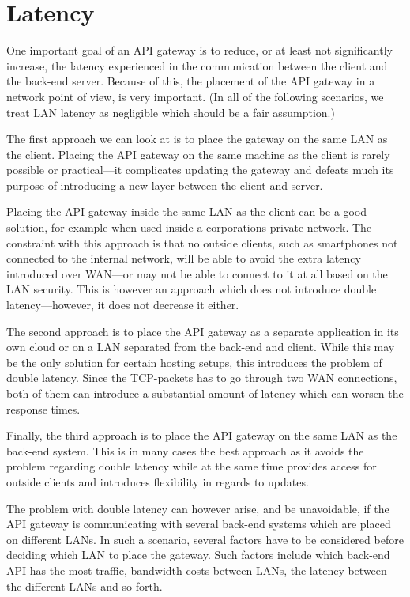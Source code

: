 \documentclass{cslthse-msc}
\begin{document}
\section{Latency}
One important goal of an API gateway is to reduce, or at least not significantly increase, the latency experienced in the communication between the client and the back-end server. Because of this, the placement of the API gateway in a network point of view, is very important. (In all of the following scenarios, we treat LAN latency as negligible which should be a fair assumption.)

The first approach we can look at is to place the gateway on the same LAN as the client. Placing the API gateway on the same machine as the client is rarely possible or practical---it complicates updating the gateway and defeats much its purpose of introducing a new layer between the client and server. 

Placing the API gateway inside the same LAN as the client can be a good solution, for example when used inside a corporations private network. The constraint with this approach is that no outside clients, such as smartphones not connected to the internal network, will be able to avoid the extra latency introduced over WAN---or may not be able to connect to it at all based on the LAN security. This is however an approach which does not introduce double latency---however, it does not decrease it either.

The second approach is to place the API gateway as a separate application in its own cloud or on a LAN separated from the back-end and client. While this may be the only solution for certain hosting setups, this introduces the problem of double latency. Since the TCP-packets has to go through two WAN connections, both of them can introduce a substantial amount of latency which can worsen the response times.

Finally, the third approach is to place the API gateway on the same LAN as the back-end system. This is in many cases the best approach as it avoids the problem regarding double latency while at the same time provides access for outside clients and introduces flexibility in regards to updates. 

The problem with double latency can however arise, and be unavoidable, if the API gateway is communicating with several back-end systems which are placed on different LANs. In such a scenario, several factors have to be considered before deciding which LAN to place the gateway. Such factors include which back-end API has the most traffic, bandwidth costs between LANs, the latency between the different LANs and so forth.
\end{document}
